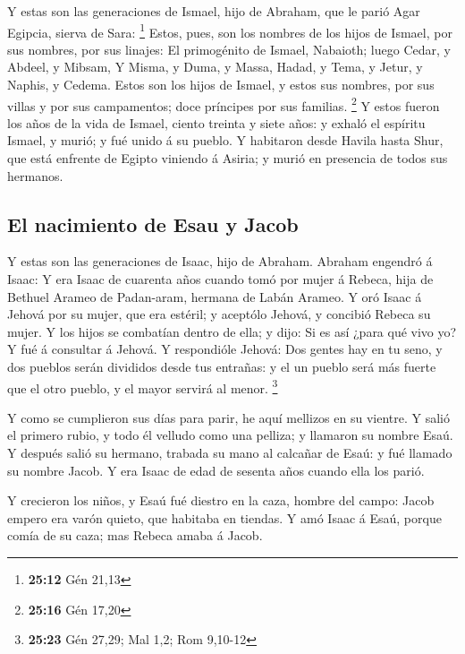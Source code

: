  Y estas son las generaciones de Ismael, hijo de Abraham,
que le parió Agar Egipcia, sierva de Sara: \footnote{\textbf{25:12} Gén
  21,13}  Estos, pues, son los nombres de los hijos de
Ismael, por sus nombres, por sus linajes: El primogénito de Ismael,
Nabaioth; luego Cedar, y Abdeel, y Mibsam,  Y Misma, y
Duma, y Massa,  Hadad, y Tema, y Jetur, y Naphis, y Cedema.
 Estos son los hijos de Ismael, y estos sus nombres, por
sus villas y por sus campamentos; doce príncipes por sus familias.
\footnote{\textbf{25:16} Gén 17,20}  Y estos fueron los
años de la vida de Ismael, ciento treinta y siete años: y exhaló el
espíritu Ismael, y murió; y fué unido á su pueblo.  Y
habitaron desde Havila hasta Shur, que está enfrente de Egipto viniendo
á Asiria; y murió en presencia de todos sus hermanos.

\hypertarget{el-nacimiento-de-esau-y-jacob}{%
\subsection{El nacimiento de Esau y
Jacob}\label{el-nacimiento-de-esau-y-jacob}}

 Y estas son las generaciones de Isaac, hijo de Abraham.
Abraham engendró á Isaac:  Y era Isaac de cuarenta años
cuando tomó por mujer á Rebeca, hija de Bethuel Arameo de Padan-aram,
hermana de Labán Arameo.  Y oró Isaac á Jehová por su
mujer, que era estéril; y aceptólo Jehová, y concibió Rebeca su mujer.
 Y los hijos se combatían dentro de ella; y dijo: Si es así
¿para qué vivo yo? Y fué á consultar á Jehová.  Y
respondióle Jehová: Dos gentes hay en tu seno, y dos pueblos serán
divididos desde tus entrañas: y el un pueblo será más fuerte que el otro
pueblo, y el mayor servirá al menor. \footnote{\textbf{25:23} Gén 27,29;
  Mal 1,2; Rom 9,10-12}

 Y como se cumplieron sus días para parir, he aquí mellizos
en su vientre.  Y salió el primero rubio, y todo él velludo
como una pelliza; y llamaron su nombre Esaú.  Y después
salió su hermano, trabada su mano al calcañar de Esaú: y fué llamado su
nombre Jacob. Y era Isaac de edad de sesenta años cuando ella los parió.

 Y crecieron los niños, y Esaú fué diestro en la caza,
hombre del campo: Jacob empero era varón quieto, que habitaba en
tiendas.  Y amó Isaac á Esaú, porque comía de su caza; mas
Rebeca amaba á Jacob.

